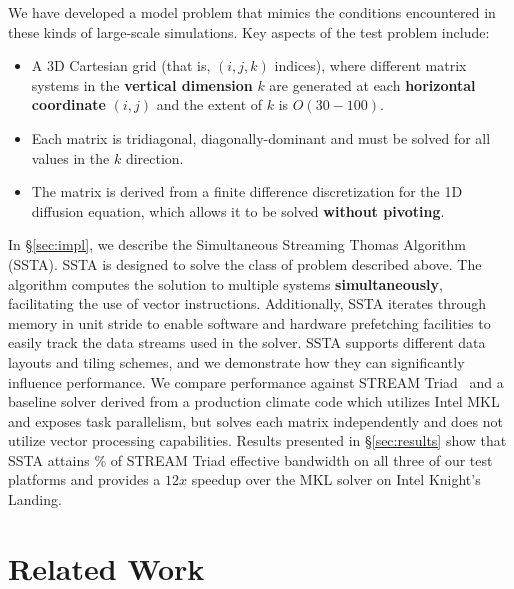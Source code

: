 \documentclass[10pt, conference, compsocconf]{IEEEtran}
\newcommand{\textapprox}{\texttildelow}
\begin{document}
We have developed a model problem that mimics the conditions encountered in
  these kinds of large-scale simulations. 
Key aspects of the test problem include:
\begin{itemize}
\item A 3D Cartesian grid (that is, \((i,j,k)\) indices), where different matrix
  systems in the \textbf{vertical dimension} \(k\) are generated at each
  \textbf{horizontal coordinate} \((i,j)\) and the extent of \(k\) is
  \(O(30-100)\).
\item Each matrix is tridiagonal, diagonally-dominant and must be solved for
  all values in the \(k\) direction.
\item The matrix is derived from a finite difference discretization for the
  1D diffusion equation, which allows it to be solved \textbf{without pivoting}.
\end{itemize}

In \S\ref{sec:impl}, we describe the Simultaneous Streaming Thomas
  Algorithm (SSTA).
SSTA is designed to solve the class of problem described above.
The algorithm computes the solution to multiple systems \textbf{simultaneously},
  facilitating the use of vector instructions.
Additionally, SSTA iterates through memory in unit stride to enable software and 
  hardware prefetching facilities to easily track the data streams used in the
  solver.
SSTA supports different data layouts and tiling schemes, and we demonstrate how
  they can significantly influence performance.
We compare performance against STREAM Triad~\cite{stream} and a baseline solver
  derived from a production climate code which utilizes Intel MKL and exposes
  task parallelism, but solves each matrix independently and does not utilize
  vector processing capabilities.
Results presented in \S\ref{sec:results} show that SSTA attains \textapprox 90\%
  of STREAM Triad effective bandwidth on all three of our test platforms and
  provides a \textapprox \(12x\) speedup over the MKL solver on Intel Knight's
  Landing.

\section{Related Work}
\label{sec:related}
\end{document}
